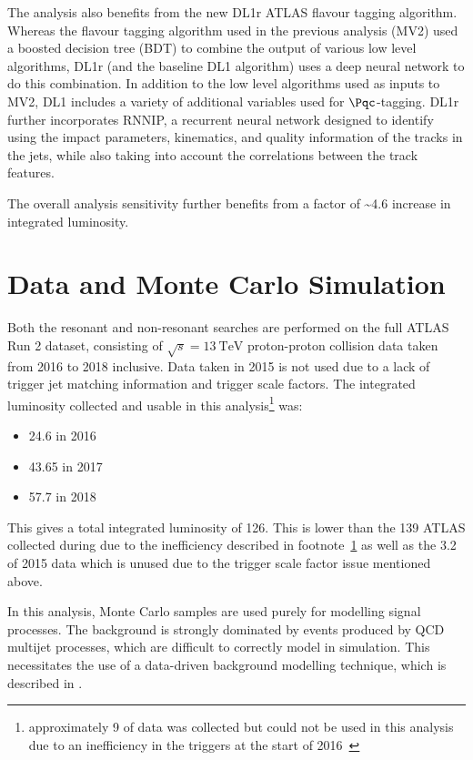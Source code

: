 The analysis also benefits from the new DL1r ATLAS flavour tagging algorithm.
Whereas the flavour tagging algorithm used in the previous analysis (MV2) used a
boosted decision tree (BDT) to combine the output of various low level
algorithms, DL1r (and the baseline DL1 algorithm) uses a deep neural network to
do this combination. In addition to the low level algorithms used as inputs to
MV2, DL1 includes a variety of additional variables used for $\Pqc$-tagging. DL1r
further incorporates RNNIP, a recurrent neural network designed
to identify \bjets using the impact parameters, kinematics, and quality
information of the tracks in the jets, while also taking into account the
correlations between the track features.

The overall analysis sensitivity further benefits from a factor of
\textasciitilde 4.6 increase in integrated luminosity.

\section{Data and Monte Carlo Simulation}
Both the resonant and non-resonant searches are performed on the full ATLAS Run 2 dataset, consisting of 
$\sqrt{s} = \SI{13}{\TeV}$ proton-proton collision data taken from 2016 to 2018 inclusive. Data taken in 2015 
is not used due to a lack of trigger jet matching
information and \bjet trigger scale factors. The integrated luminosity collected
and usable in this analysis\footnote{\label{foot:lost-lumi}approximately
  \SI{9}{\ifb} of data was collected but could not be used in this analysis due
  to an inefficiency in the \bjet triggers at the start of 2016~\cite{ATL-COM-DAQ-2019-150}} was:
\begin{itemize}
  \item \SI{24.6}{\ifb} in 2016
  \item \SI{43.65}{\ifb} in 2017
  \item \SI{57.7}{\ifb} in 2018
\end{itemize}

This gives a total integrated luminosity of \SI{126}{\ifb}.
This is lower than the \SI{139}{\ifb} ATLAS collected during \RunTwo
\cite{ATLAS-CONF-2019-021} due to the inefficiency described in
footnote~\ref{foot:lost-lumi} as well as the \SI{3.2}{\ifb} 
of 2015 data which is unused due to the trigger scale factor 
issue mentioned above.

In this analysis, Monte Carlo samples are used purely for modelling signal
processes. The background is strongly dominated by events produced by QCD
multijet processes, which are difficult to correctly model in simulation. This
necessitates the use of a data-driven background modelling technique, which is
described in \Sect{\ref{sec:bkgdestimation}}.

